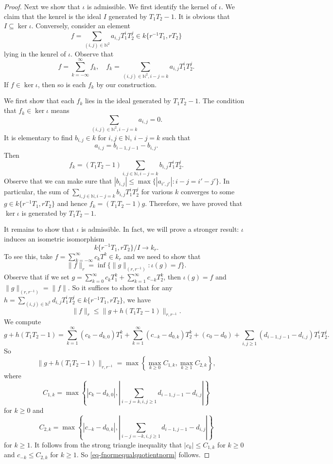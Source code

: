 \begin{proof}
    Next we show that $\iota$ is admissible. We first identify the kernel of $\iota$. We claim that the kenrel is the ideal $I$ generated by $T_1T_2-1$. It is obvious that $I\subseteq \ker \iota$. Conversely, consider an element
    \[
        f=\sum_{(i,j)\in \mathbb{N}^2} a_{i,j}T_1^i T_2^j\in  k\{r^{-1}T_1,rT_2\}  
    \]
    lying in the kenrel of $\iota$. Observe that 
    \[
        f=\sum_{k=-\infty}^{\infty}f_k, \quad f_k=\sum_{(i,j)\in \mathbb{N}^2, i-j=k} a_{i,j}T_1^i T_2^j.
    \]
    If $f\in \ker\iota$, then so is each $f_k$ by our construction. 
    
    We first show that each $f_k$ lies in the ideal generated by $T_1T_2-1$. The condition that $f_k\in \ker\iota$ means
    \[
        \sum_{(i,j)\in \mathbb{N}^2, i-j=k} a_{i,j}=0.  
    \]
    It is elementary to find $b_{i,j}\in k$ for $i,j\in \mathbb{N}$, $i-j=k$ such that
    \[
        a_{i,j}=b_{i-1,j-1} -b_{i,j}.
    \]
    Then 
    \[
      f_k=(T_1T_2-1)\sum_{i,j\in \mathbb{N},i-j=k}b_{i,j}T_1^i T_2^j.
    \]
    Observe that we can make sure that $|b_{i,j}|\leq \max\{|a_{i',j'}|:i-j=i'-j'\}$. In particular, the sum of $\sum_{i,j\in \mathbb{N},i-j=k}b_{i,j}T_1^i T_2^j$ for various $k$ converges to some $g\in k\{r^{-1}T_1,rT_2\}$ and hence $f_k=(T_1T_2-1)g$.
    Therefore, we have proved that $\ker \iota$ is generated by $T_1T_2-1$.

    It remains to show that $\iota$ is admissible. In fact, we will prove a stronger result: $\iota$ induces an isometric isomorphism
    \[
        k\{r^{-1}T_1,rT_2\}/I\rightarrow k_r. 
    \]
    To see this, take $f=\sum_{k=-\infty}^{\infty}c_k T^k\in k_r$ and we need to show that 
    \[
        \|f\|_r=\inf\{\|g\|_{(r,r^{-1})}:\iota(g)=f\}.
    \]
    Observe that if we set $g=\sum_{k=0}^{\infty} c_k T_1^k+\sum_{k=1}^{\infty}c_{-k}T_2^k$, then $\iota(g)=f$ and $\|g\|_{(r,r^{-1})}=\|f\|$. So it suffices to show that for any $h=\sum_{(i,j)\in \mathbb{N}^2} d_{i,j}T_1^iT_2^j\in k\{r^{-1}T_1,rT_2\}$, we have
    \begin{equation}\label{eq-fnormequalquotientnorm}
        \|f\|_r\leq \|g+h(T_1T_2-1)\|_{r,r^{-1}}.  
    \end{equation}
    We compute
    \[
        g+h(T_1T_2-1)=\sum_{k=1}^{\infty}(c_k-d_{k,0})T_1^k+\sum_{k=1}^{\infty}(c_{-k}-d_{0,k})T_2^k+(c_0-d_0)+\sum_{i,j\geq 1} (d_{i-1,j-1}-d_{i,j})T_1^iT_2^j.
    \]
    So 
    \[
        \|g+h(T_1T_2-1)\|_{r,r^{-1}}=\max\left\{\max_{k\geq 0} C_{1,k},\max_{k\geq 1} C_{2,k} \right\},  
    \]
    where
    \[
        C_{1,k}=\max\left\{ |c_k-d_{k,0}|, \left|\sum_{i-j=k,i,j\geq 1} d_{i-1,j-1}-d_{i,j}\right| \right\} 
    \]
    for $k\geq 0$
    and
    \[
        C_{2,k}=\max\left\{ |c_{-k}-d_{0,k}|, \left|\sum_{i-j=-k,i,j\geq 1} d_{i-1,j-1}-d_{i,j}\right| \right\}
    \] 
    for $k\geq 1$.
    It follows from the strong triangle inequality that $|c_k|\leq C_{1,k}$ for $k\geq 0$ and $c_{-k}\leq C_{2,k}$ for $k\geq 1$. So \eqref{eq-fnormequalquotientnorm} follows.
\end{proof}

